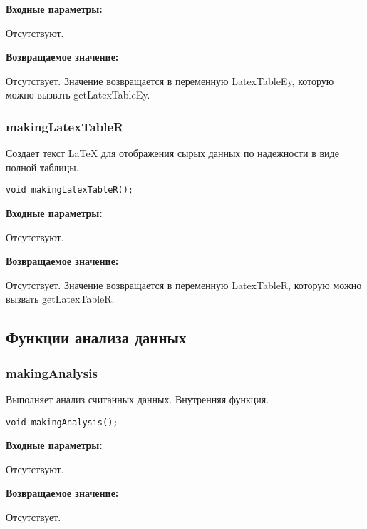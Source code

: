 \documentclass[a4paper,12pt]{article}
\begin{document}
\textbf{Входные параметры:}

Отсутствуют.

\textbf{Возвращаемое значение:}

Отсутствует. Значение возвращается в переменную LatexTableEy, которую можно вызвать getLatexTableEy.


\subsubsection{makingLatexTableR}\label{makingLatexTableR}

Создает текст LaTeX для отображения сырых данных по надежности в виде полной таблицы.


\begin{lstlisting}[label=code_syntax_makingLatexTableR,caption=Синтаксис]
void makingLatexTableR();
\end{lstlisting}

\textbf{Входные параметры:}

Отсутствуют.

\textbf{Возвращаемое значение:}

Отсутствует. Значение возвращается в переменную LatexTableR, которую можно вызвать getLatexTableR.


\subsection{Функции анализа данных}

\subsubsection{makingAnalysis}\label{makingAnalysis}

Выполняет анализ считанных данных. Внутренняя функция.


\begin{lstlisting}[label=code_syntax_makingAnalysis,caption=Синтаксис]
void makingAnalysis();
\end{lstlisting}

\textbf{Входные параметры:}

Отсутствуют.

\textbf{Возвращаемое значение:}

Отсутствует.
\end{document}
